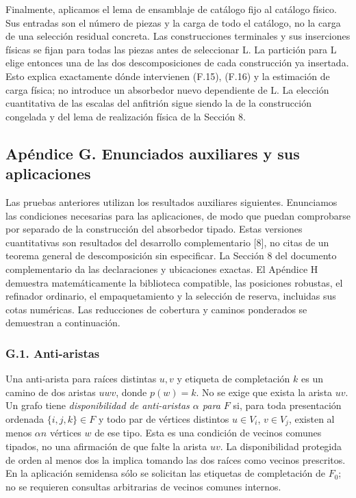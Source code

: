 \documentclass[spanish,11pt,a4paper]{article}
\begin{document}
Finalmente, aplicamos el lema de ensamblaje de catálogo fijo al catálogo físico. Sus entradas son el número de piezas y la carga de todo el catálogo, no la carga de una selección residual concreta. Las construcciones terminales y sus inserciones físicas se fijan para todas las piezas antes de seleccionar L. La partición para L elige entonces una de las dos descomposiciones de cada construcción ya insertada. Esto explica exactamente dónde intervienen (F.15), (F.16) y la estimación de carga física; no introduce un absorbedor nuevo dependiente de L. La elección cuantitativa de las escalas del anfitrión sigue siendo la de la construcción congelada y del lema de realización física de la Sección 8.

\subsection{Apéndice G. Enunciados auxiliares y sus aplicaciones}\label{apuxe9ndice-g.-enunciados-auxiliares-y-sus-aplicaciones}

Las pruebas anteriores utilizan los resultados auxiliares siguientes. Enunciamos las condiciones necesarias para las aplicaciones, de modo que puedan comprobarse por separado de la construcción del absorbedor tipado. Estas versiones cuantitativas son resultados del desarrollo complementario {[}8{]}, no citas de un teorema general de descomposición sin especificar. La Sección 8 del documento complementario da las declaraciones y ubicaciones exactas. El Apéndice H demuestra matemáticamente la biblioteca compatible, las posiciones robustas, el refinador ordinario, el empaquetamiento y la selección de reserva, incluidas sus cotas numéricas. Las reducciones de cobertura y caminos ponderados se demuestran a continuación.

\subsubsection{G.1. Anti-aristas}\label{g.1.-anti-aristas}

Una anti-arista para raíces distintas \(u,v\) y etiqueta de completación \(k\) es un camino de dos aristas \(uwv\), donde \(p(w)=k\). No se exige que exista la arista \(uv\). Un grafo tiene \emph{disponibilidad de anti-aristas \(\alpha\) para \(F\)} si, para toda presentación ordenada \(\{i,j,k\}\in F\) y todo par de vértices distintos \(u\in V_i\), \(v\in V_j\), existen al menos \(\alpha n\) vértices \(w\) de ese tipo. Esta es una condición de vecinos comunes tipados, no una afirmación de que falte la arista \(uv\). La disponibilidad protegida de orden al menos dos la implica tomando las dos raíces como vecinos prescritos. En la aplicación semidensa sólo se solicitan las etiquetas de completación de \(F_0\); no se requieren consultas arbitrarias de vecinos comunes internos.
\end{document}
